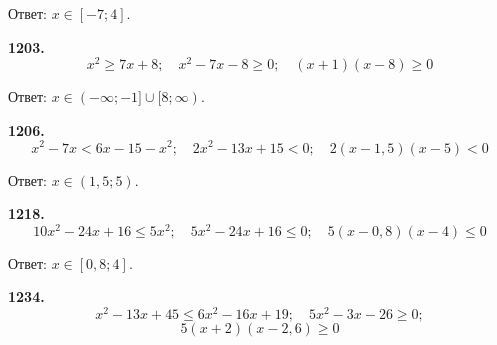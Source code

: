 \null \hspace*{\fill} Ответ: $x\in[-7;4]$. 

\textbf{1203.} $$x^2\geq7x+8;\quad x^2-7x-8\geq0;\quad (x+1)(x-8)\geq0$$

\begin{figure}[h!]
\end{figure}

\null \hspace*{\fill}Ответ: $x\in(-\infty;-1]\cup[8;\infty).$

\textbf{1206.} $$x^2-7x<6x-15-x^2;\quad 2x^2-13x+15<0;\quad 2(x-1,5)(x-5)<0$$

\begin{figure}[h!]
\end{figure}

\null \hspace*{\fill} Ответ: $x\in(1,5;5)$.

\newpage \textbf{1218.} $$10x^2-24x+16\leq 5x^2;\quad 5x^2-24x+16\leq 0;\quad 5(x-0,8)(x-4)\leq0$$

\begin{figure}[h!]
\end{figure}

\null \hspace*{\fill} Ответ: $x\in[0,8;4]$. 

\textbf{1234.} $$x^2-13x+45\leq 6x^2-16x+19;\quad 5x^2-3x-26\geq0;$$ $$ 5(x+2)(x-2,6)\geq0$$

\begin{figure}[h!]
\end{figure}


